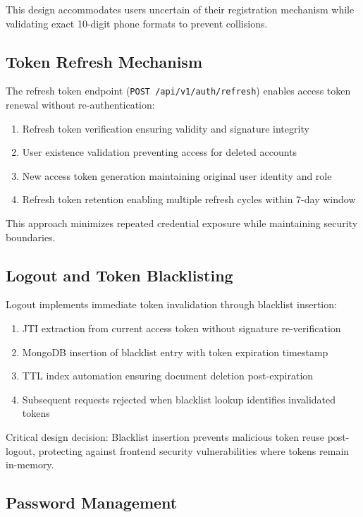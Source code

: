 \documentclass[conference]{IEEEtran}
\begin{document}
This design accommodates users uncertain of their registration mechanism while validating exact 10-digit phone formats to prevent collisions.

\subsection{Token Refresh Mechanism}

The refresh token endpoint (\texttt{POST /api/v1/auth/refresh}) enables access token renewal without re-authentication:

\begin{enumerate}
\item Refresh token verification ensuring validity and signature integrity
\item User existence validation preventing access for deleted accounts
\item New access token generation maintaining original user identity and role
\item Refresh token retention enabling multiple refresh cycles within 7-day window
\end{enumerate}

This approach minimizes repeated credential exposure while maintaining security boundaries.

\subsection{Logout and Token Blacklisting}

Logout implements immediate token invalidation through blacklist insertion:

\begin{enumerate}
\item JTI extraction from current access token without signature re-verification
\item MongoDB insertion of blacklist entry with token expiration timestamp
\item TTL index automation ensuring document deletion post-expiration
\item Subsequent requests rejected when blacklist lookup identifies invalidated tokens
\end{enumerate}

Critical design decision: Blacklist insertion prevents malicious token reuse post-logout, protecting against frontend security vulnerabilities where tokens remain in-memory.

\subsection{Password Management}
\end{document}
